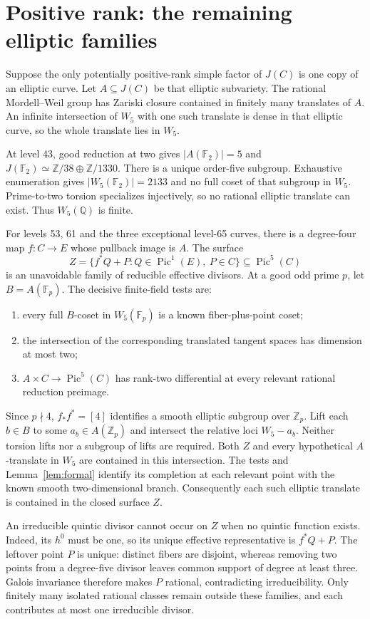 \documentclass[11pt]{article}
\newcommand{\Q}{\mathbb Q}
\newcommand{\Fp}{\mathbb F_p}
\newcommand{\Pic}{\operatorname{Pic}}
\theoremstyle{remark}\newtheorem{remark}[theorem]{Remark}
\begin{document}
\section{Positive rank: the remaining elliptic families}
Suppose the only potentially positive-rank simple factor of $J(C)$ is
one copy of an elliptic curve. Let $A\subseteq J(C)$ be that elliptic
subvariety. The rational Mordell--Weil group has Zariski closure contained
in finitely many translates of $A$. An infinite intersection of $W_5$
with one such translate is dense in that elliptic curve, so the whole
translate lies in $W_5$.

At level 43, good reduction at two gives $|A(\mathbb F_2)|=5$ and
$J(\mathbb F_2)\simeq\mathbb Z/38\oplus\mathbb Z/1330$. There is
a unique order-five subgroup. Exhaustive enumeration gives
$|W_5(\mathbb F_2)|=2133$ and no full coset of that subgroup in $W_5$.
Prime-to-two torsion specializes injectively, so no rational elliptic
translate can exist. Thus $W_5(\Q)$ is finite.

For levels 53, 61 and the three exceptional level-65 curves, there is
a degree-four map $f:C\to E$ whose pullback image is $A$. The surface
\[
 Z=\{f^*Q+P:Q\in\Pic^1(E),\ P\in C\}\subseteq\Pic^5(C)
\]
is an unavoidable family of reducible effective divisors. At a good odd
prime $p$, let $B=A(\Fp)$. The decisive finite-field tests are:
\begin{enumerate}
\item every full $B$-coset in $W_5(\Fp)$ is a known fiber-plus-point coset;
\item the intersection of the corresponding translated tangent spaces
      has dimension at most two;
\item $A\times C\to\Pic^5(C)$ has rank-two differential at every
      relevant rational reduction preimage.
\end{enumerate}
Since $p\nmid4$, $f_*f^*=[4]$ identifies a smooth elliptic subgroup
over $\mathbb Z_p$. Lift each $b\in B$ to some $a_b\in A(\mathbb Z_p)$
and intersect the relative loci $W_5-a_b$. Neither torsion lifts nor
a subgroup of lifts are required. Both $Z$ and every hypothetical
$A$-translate in $W_5$ are contained in this intersection. The tests and
Lemma~\ref{lem:formal} identify its completion at each relevant point
with the known smooth two-dimensional branch. Consequently each such
elliptic translate is contained in the closed surface $Z$.

An irreducible quintic divisor cannot occur on $Z$ when no quintic
function exists. Indeed, its $h^0$ must be one, so its unique effective
representative is $f^*Q+P$. The leftover point $P$ is unique: distinct
fibers are disjoint, whereas removing two points from a degree-five
divisor leaves common support of degree at least three. Galois invariance
therefore makes $P$ rational, contradicting irreducibility. Only finitely
many isolated rational classes remain outside these families, and each
contributes at most one irreducible divisor.
\end{document}
